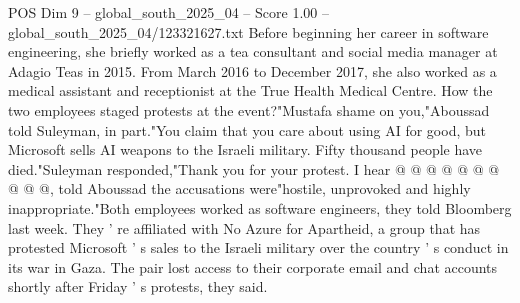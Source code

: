 \begin{textsample}{POS Dim 9 – global\_south\_2025\_04 – Score 1.00 – global\_south\_2025\_04/123321627.txt}
Before beginning her career in software engineering, she briefly worked as a tea consultant and social media manager at Adagio Teas in 2015.
From March 2016 to December 2017, she also worked as a medical assistant and receptionist at the True Health Medical Centre.
How the two employees staged protests at the event?"Mustafa shame on you,"Aboussad told Suleyman, in part."You claim that you care about using AI for good, but Microsoft sells AI weapons to the Israeli military.
Fifty thousand people have died."Suleyman responded,"Thank you for your protest.
I hear @ @ @ @ @ @ @ @ @ @, told Aboussad the accusations were"hostile, unprovoked and highly inappropriate."Both employees worked as software engineers, they told Bloomberg last week.
They ' re affiliated with No Azure for Apartheid, a group that has protested Microsoft ' s sales to the Israeli military over the country ' s conduct in its war in Gaza.
The pair lost access to their corporate email and chat accounts shortly after Friday ' s protests, they said.

\end{textsample}
